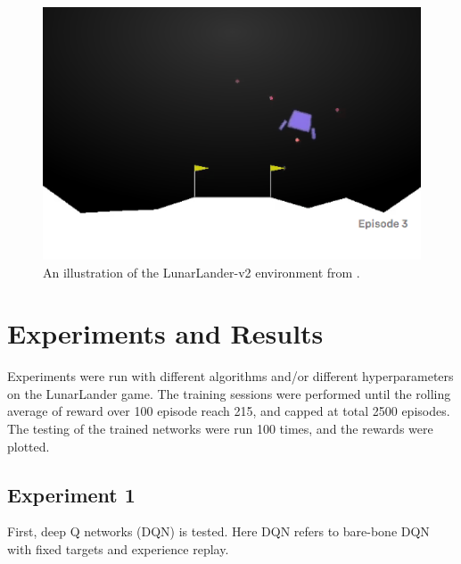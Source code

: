 \documentclass[10pt]{article}
\begin{document}
\begin{figure}[h!]
  \centering
  \includegraphics[width=0.5\linewidth]{illustration.png}
    \caption{An illustration of the LunarLander-v2 environment from .}
  \label{fig:lunarlander}
\end{figure}


\section{Experiments and Results} \label{experiments}
Experiments were run with different algorithms and/or different hyperparameters on the LunarLander game. The training sessions were performed until the rolling average of reward over 100 episode reach 215, and capped at total 2500 episodes. The testing of the trained networks were run 100 times, and the rewards were plotted.

\par




\subsection{Experiment 1} \label{experiment1}
First, deep Q networks (DQN) is tested. Here DQN refers to bare-bone DQN with fixed targets and experience replay.\cite{MnihPlayingAtariDeep2013, RoderickImplementingDeepQNetwork2017} \par
\noindent
\end{document}
